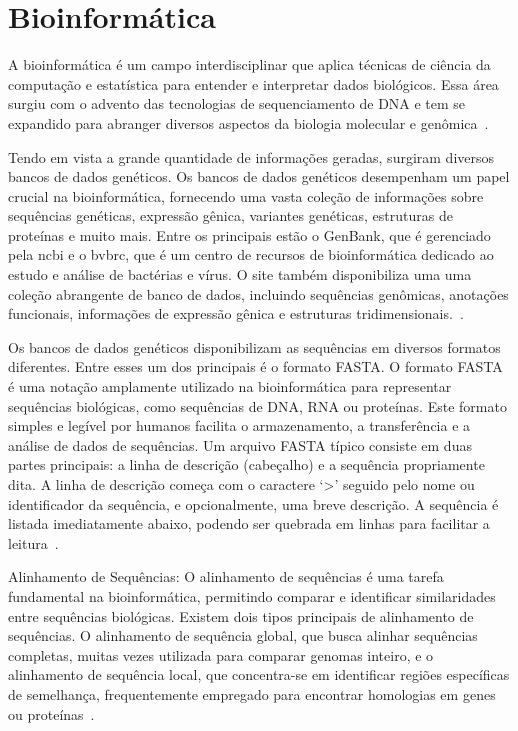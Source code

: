 \section{Bioinformática}
A bioinformática é um campo interdisciplinar que aplica técnicas de ciência da computação e estatística para entender e interpretar dados biológicos. Essa área surgiu com o advento das tecnologias de sequenciamento de DNA e tem se expandido para abranger diversos aspectos da biologia molecular e genômica~\cite{bioinformatica_verli_2014}.

Tendo em vista a grande quantidade de informações geradas, surgiram diversos bancos de dados genéticos. Os bancos de dados genéticos desempenham um papel crucial na bioinformática, fornecendo uma vasta coleção de informações sobre sequências genéticas, expressão gênica, variantes genéticas, estruturas de proteínas e muito mais. Entre os principais estão o GenBank, que é gerenciado pela \gls{ncbi} e o \gls{bvbrc}, que é um centro de recursos de bioinformática dedicado ao estudo e análise de bactérias e vírus. O site também disponibiliza uma uma coleção abrangente de banco de dados, incluindo sequências genômicas, anotações funcionais, informações de expressão gênica e estruturas tridimensionais.~\cite{ncbi, bvbrc}.

Os bancos de dados genéticos disponibilizam as sequências em diversos formatos diferentes. Entre esses um dos principais é o formato {FASTA}. O formato {FASTA} é uma notação amplamente utilizado na bioinformática para representar sequências biológicas, como sequências de DNA, RNA ou proteínas. Este formato simples e legível por humanos facilita o armazenamento, a transferência e a análise de dados de sequências. Um arquivo {FASTA} típico consiste em duas partes principais: a linha de descrição (cabeçalho) e a sequência propriamente dita. A linha de descrição começa com o caractere `>' seguido pelo nome ou identificador da sequência, e opcionalmente, uma breve descrição. A sequência é listada imediatamente abaixo, podendo ser quebrada em linhas para facilitar a leitura~\cite{fasta_improved_pearson_1988}.

Alinhamento de Sequências:
O alinhamento de sequências é uma tarefa fundamental na bioinformática, permitindo comparar e identificar similaridades entre sequências biológicas. Existem dois tipos principais de alinhamento de sequências. O alinhamento de sequência global, que busca alinhar sequências completas, muitas vezes utilizada para comparar genomas inteiro, e o alinhamento de sequência local, que concentra-se em identificar regiões específicas de semelhança, frequentemente empregado para encontrar homologias em genes ou proteínas~\cite{similarities_needleman-wunsch_1970,bioinformatics_david_2004}.


